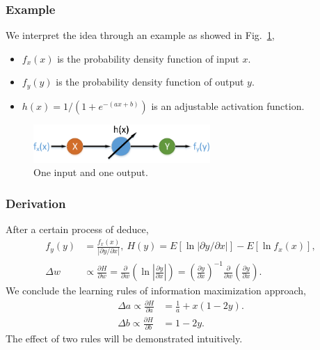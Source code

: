 \documentclass[10pt, mathserif]{beamer}	%
\newcommand{\ftitle}[1]{\frametitle{\hspace{4ex} {#1}}}	%
\begin{document}
\begin{CJK}{UTF8}{song}
\begin{frame}
	\ftitle{Example}
	We interpret the idea through an example as showed in Fig.~\ref{fig:network},
	\begin{itemize}
		\item $f_x(x)$ is the probability density function of input $x$.
		\item $f_y(y)$ is the probability density function of output $y$.
		\item $h(x)=1/(1+e^{-(ax+b)})$ is an adjustable activation function.
	\end{itemize}
	\begin{figure}[htbp]
		\includegraphics[width=0.6\textwidth]{network.pdf}
		\caption{One input and one output.} \label{fig:network}
	\end{figure}
\end{frame}

\begin{frame}
	\ftitle{Derivation}
	After a certain process of deduce,
	\begin{align}
		f_y(y) &= \frac{f_x(x)}{|\partial y/\partial x|},\ H(y)=E[\ln |\partial y/\partial x|] - E[\ln f_x(x)],\\
		\Delta w & \varpropto \frac{\partial H}{\partial w} = \frac{\partial }{\partial w} \left( \ln \left| \frac{\partial y}{\partial x} \right| \right) = \left( \frac{\partial y}{\partial x} \right)^{-1} \frac{\partial }{\partial w} \left( \frac{\partial y}{\partial x} \right).
	\end{align}
	We conclude the {\color{red}learning rules} of information maximization approach,
	\begin{align}
		\Delta a \varpropto \frac{\partial H}{\partial a} &= \frac{1}{a} + x(1-2y).\\
		\Delta b \varpropto \frac{\partial H}{\partial b} &= 1-2y.
	\end{align}
	The effect of two rules will be demonstrated intuitively.
\end{frame}


\end{CJK}
\end{document}
